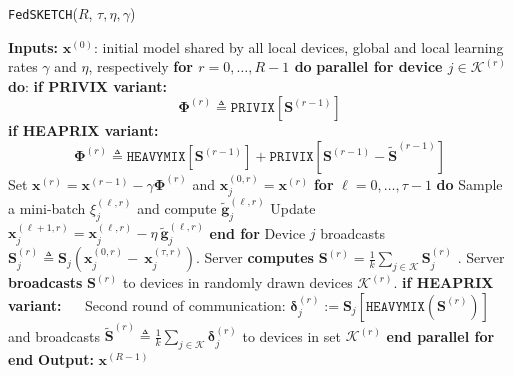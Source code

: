 \documentclass[11pt]{article}
\newcommand\DrawBoxhom[3][]{%
  \begin{tikzpicture}[remember picture,overlay]
    \draw[overlay,fill=gray!30,#1] 
    ([xshift=-0.5em,yshift=-0.1ex]{pic cs:#2}) 
    rectangle 
    ([xshift=35pt,yshift=3.1ex]pic cs:#3);
  \end{tikzpicture}%
}
\newcommand\DrawBoxxhom[3][]{%
  \begin{tikzpicture}[remember picture,overlay]
    \draw[overlay,fill=gray!30,#1] 
    ([xshift=-5.9em,yshift=-1.1ex]{pic cs:#2}) 
    rectangle 
    ([xshift=80pt,yshift=-1.5ex]pic cs:#3);
  \end{tikzpicture}%
}
\begin{document}
\begin{algorithm}[t]
\caption{\texttt{FedSKETCH}($R$, $\tau, \eta, \gamma$) }\label{Alg:PFLHom}
\begin{algorithmic}[1]
\STATE \textbf{Inputs:} $\boldsymbol{x}^{(0)}$: initial  model shared by all local devices, global and local learning rates $\gamma$ and $\eta$, respectively
\STATE \textbf{for $r=0, \ldots, R-1$ do}
\STATE \textbf{parallel for device $j\in \mathcal{K}^{(r)}$ do}:
\STATE \hspace{0.02in} \textbf{if PRIVIX variant:} 
{\small $${\mathbf{\Phi}}^{(r)}\triangleq  {\texttt{PRIVIX}}\left[{\mathbf{S}}^{(r-1)}\right]$$}
\STATE \hspace{0.02in} \textbf{if HEAPRIX variant:} \label{line:heaprix1}
{\small $${\mathbf{\Phi}}^{(r)}\triangleq \texttt{HEAVYMIX}\left[{\mathbf{S}}^{(r-1)}\right]+\texttt{PRIVIX}\left[{\mathbf{S}}^{(r-1)}- \tilde{\mathbf{S}}^{(r-1)}\right]$$}
\STATE Set $\boldsymbol{x}^{(r)}=\boldsymbol{x}^{(r-1)}-\gamma{\mathbf{\Phi}}^{(r)}$ and $\boldsymbol{x}_j^{(0,r)}=\boldsymbol{x}^{(r)}$ 
\STATE \hspace{0.01in} \textbf{for} $\ell=0,\ldots,\tau-1$ \textbf{do}
\STATE \hspace{0.03in} Sample a mini-batch $\xi_j^{(\ell,r)}$ and compute $\tilde{\mathbf{g}}_{j}^{(\ell,r)}$
\STATE Update $\boldsymbol{x}^{(\ell+1,r)}_{j}=\boldsymbol{x}^{(\ell,r)}_j-\eta~ \tilde{\mathbf{g}}_{j}^{(\ell,r)}$ \label{eq:update-rule-alg}
\STATE \hspace{0.05in}\textbf{end for}
\STATE Device $j$ broadcasts $\mathbf{S}^{(r)}_{j}\triangleq\mathbf{S}_{j}\left(\boldsymbol{x}_j^{(0,r)}-~{\boldsymbol{x}}_{j}^{(\tau,r)}\right)$.
\STATE Server \textbf{computes} $ {\mathbf{S}}^{(r)}=\frac{1}{k}\sum_{j\in\mathcal{K}}\mathbf{S}^{(r)}_{j}$ .\label{line:heaprix2}
\STATE Server \textbf{broadcasts} ${\mathbf{S}}^{(r)}$ to devices in randomly drawn devices $\mathcal{K}^{(r)}$.
\vspace{0.1cm}
\STATE \hspace{0.04in} \textbf{if HEAPRIX variant:} 
\STATE $\quad$ Second round of communication: $\mathbf{\delta}_j^{(r)} :=  \mathbf{S}_j\left[\texttt{HEAVYMIX}(\mathbf{S}^{(r)})\right]$ and broadcasts $\tilde{\mathbf{S}}^{(r)}\triangleq\frac{1}{k}\sum_{j\in\mathcal{K}}\mathbf{\delta}_j^{(r)}$ to devices in set $\mathcal{K}^{(r)}$
\vspace{0.1cm}
\STATE \textbf{end parallel for}
\STATE \textbf{end}
\STATE \textbf{Output:} ${\boldsymbol{x}}^{(R-1)}$
\vspace{- 0.1cm}
\end{algorithmic}
\end{algorithm}
\end{document}
